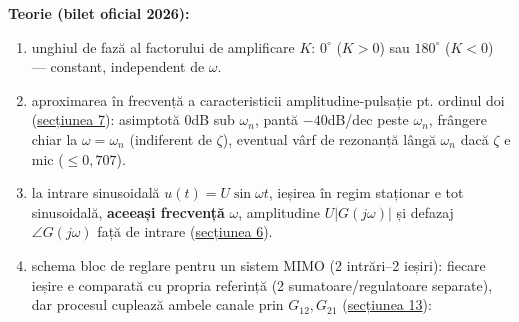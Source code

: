 \documentclass[10pt,a4paper]{article}
\begin{document}
\begin{center}
\end{center}

\begin{keyeq}\color{red!65!black}
\textbf{Teorie (bilet oficial 2026):}
\begin{enumerate}
\item unghiul de fază al factorului de amplificare $K$: $0^\circ$ ($K{>}0$) sau $180^\circ$ ($K{<}0$) — constant, independent de $\omega$.
\item aproximarea în frecvență a caracteristicii amplitudine-pulsație pt. ordinul doi (\hyperref[sec:7]{secțiunea 7}): asimptotă $0$dB sub $\omega_n$, pantă $-40$dB/dec peste $\omega_n$, frângere chiar la $\omega{=}\omega_n$ (indiferent de $\zeta$), eventual vârf de rezonanță lângă $\omega_n$ dacă $\zeta$ e mic ($\le0{,}707$).
\item la intrare sinusoidală $u(t){=}U\sin\omega t$, ieșirea în regim staționar e tot sinusoidală, \textbf{aceeași frecvență} $\omega$, amplitudine $U|G(j\omega)|$ și defazaj $\angle G(j\omega)$ față de intrare (\hyperref[sec:6]{secțiunea 6}).
\item schema bloc de reglare pentru un sistem MIMO (2 intrări–2 ieșiri): fiecare ieșire e comparată cu propria referință (2 sumatoare/regulatoare separate), dar procesul cuplează ambele canale prin $G_{12},G_{21}$ (\hyperref[sec:13]{secțiunea 13}):
\end{enumerate}
\end{keyeq}
\end{document}
